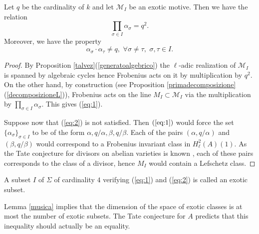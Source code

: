 \documentclass[11pt]{amsart}
\begin{document}
\begin{lemma}\label{musica}
Let $q$ be the cardinality of $k$ and let $\mathcal{M}_I$ be an exotic motive. Then we have  the relation 
\begin{equation} \label{eq:1}
\prod_{\sigma \in I}\alpha_\sigma =q^2.
\end{equation}
Moreover, we have the property 
\begin{equation} \label{eq:2}
 \alpha_\sigma \cdot \alpha_\tau \neq q, \, \, \forall \sigma \neq \tau, \,\, \sigma,\tau \in I.
\end{equation} 
\end{lemma}

\begin{proof}
By Proposition \ref{talvez}(\ref{generatoalgebrico}) the $\ell$-adic realization of $\mathcal{M}_I$ is spanned by algebraic cycles hence  Frobenius acts on it by multiplication by $q^2$.  On the other hand, by construction (see  Proposition \ref{primadecomposizione}(\ref{decomposizioneL})),  Frobenius acts on the line $ M_I\subset \mathcal{M}_I$ via the multiplication by $\prod_{\sigma \in I}\alpha_\sigma $. This gives (\ref{eq:1}).   

Suppose now that  (\ref{eq:2}) is not satisfied.    Then $(\ref{eq:1})$ would force the set    $\{\alpha_\sigma\}_{\sigma \in I}$ to be of the form  $\alpha,q/\alpha, \beta, q/\beta$.   Each of the pairs $(\alpha,q/\alpha)$ and $(\beta, q/\beta)$ would correspond to a Frobenius invariant class in $H^2_\ell (A) (1)$. As the Tate conjecture for divisors on abelian varieties is known \cite[Theorem 4]{Tate}, each of these pairs corresponds to the class of a divisor, hence   $M_I$ would contain a Lefschetz class.
\end{proof}

\begin{definition}
A subset $I$ of $\Sigma$ of cardinality $4$ verifying (\ref{eq:1}) and (\ref{eq:2}) is called an exotic subset.
\end{definition}

\begin{remark}\label{completare}
Lemma \ref{musica} implies that the dimension of the space of exotic classes is at most the number of exotic subsets. The  Tate conjecture for $A$ predicts that this inequality should actually be an equality.
\end{remark}
\end{document}

